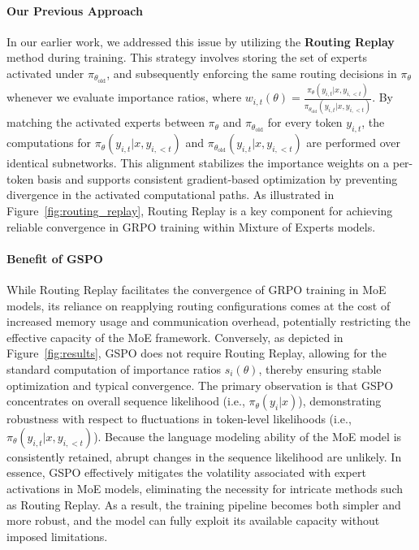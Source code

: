 \paragraph{Our Previous Approach} In our earlier work, we addressed this issue by utilizing the \textbf{Routing Replay} method during training. This strategy involves storing the set of experts activated under $\pi_{\theta_\text{old}}$, and subsequently enforcing the same routing decisions in $\pi_{\theta}$ whenever we evaluate importance ratios, where $w_{i,t}(\theta) = \frac{ \pi_{\theta} (y_{i,t} | x, y_{i,<t}) }{ \pi_{\theta_\text{old}} (y_{i,t} | x,y_{i,<t})}$. By matching the activated experts between $\pi_{\theta}$ and $\pi_{\theta_\text{old}}$ for every token $y_{i,t}$, the computations for $\pi_{\theta} (y_{i,t} | x, y_{i,<t})$ and $\pi_{\theta_\text{old}} (y_{i,t} | x,y_{i,<t})$ are performed over identical subnetworks. This alignment stabilizes the importance weights on a per-token basis and supports consistent gradient-based optimization by preventing divergence in the activated computational paths. As illustrated in Figure~\ref{fig:routing_replay}, Routing Replay is a key component for achieving reliable convergence in GRPO training within Mixture of Experts models.

\paragraph{Benefit of GSPO} While Routing Replay facilitates the convergence of GRPO training in MoE models, its reliance on reapplying routing configurations comes at the cost of increased memory usage and communication overhead, potentially restricting the effective capacity of the MoE framework. Conversely, as depicted in Figure~\ref{fig:results}, GSPO does not require Routing Replay, allowing for the standard computation of importance ratios $s_i(\theta)$, thereby ensuring stable optimization and typical convergence. The primary observation is that GSPO concentrates on overall sequence likelihood (i.e., $\pi_{\theta} (y_i | x)$), demonstrating robustness with respect to fluctuations in token-level likelihoods (i.e., $\pi_{\theta} (y_{i,t} | x, y_{i,<t})$). Because the language modeling ability of the MoE model is consistently retained, abrupt changes in the sequence likelihood are unlikely. In essence, GSPO effectively mitigates the volatility associated with expert activations in MoE models, eliminating the necessity for intricate methods such as Routing Replay. As a result, the training pipeline becomes both simpler and more robust, and the model can fully exploit its available capacity without imposed limitations.

